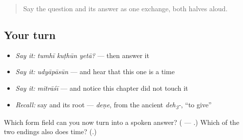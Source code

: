 \label{lesson:MR-R46-from}



\begin{quote}
Say the question and its answer as one exchange, both halves aloud.
\end{quote}

\subsection*{Your turn}
\begin{itemize}
\raggedright
  \item \emph{Say it:} \emph{tumhī kuṭhūn yetā?} — then answer it
  \item \emph{Say it:} \emph{udyāpāsūn} — and hear that this one is a time
  \item \emph{Say it:} \emph{mitrāśī} — and notice this chapter did not touch it
  \item \emph{Recall:} say \textbf{} and its root — \emph{deṇe}, from the ancient \emph{deh\textsubscript{3}-}, \textquotedblleft{}to give\textquotedblright{}
\end{itemize}

\begin{tcolorbox}[breakable,colback=teal!4,colframe=teal!35!black,title={Before you move on}]
Which form field can you now turn into a spoken answer? (\textbf{} — \textbf{  }.) Which of the two endings also does time? (\textbf{}.)
\end{tcolorbox}
